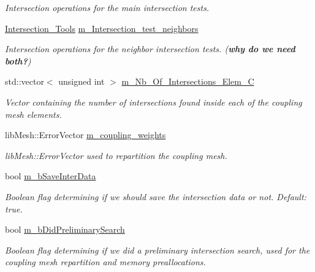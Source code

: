 \begin{DoxyCompactItemize}
\begin{DoxyCompactList}\small\item\em Intersection operations for the main intersection tests. \end{DoxyCompactList}\item 
\hyperlink{classcarl_1_1_intersection___tools}{Intersection\+\_\+\+Tools} \hyperlink{classcarl_1_1_intersection___search_a7abbfa5dc5892d9179b93563320d533b}{m\+\_\+\+Intersection\+\_\+test\+\_\+neighbors}
\begin{DoxyCompactList}\small\item\em Intersection operations for the neighbor intersection tests. ({\bfseries why do we need both?}) \end{DoxyCompactList}\item 
std\+::vector$<$ unsigned int $>$ \hyperlink{classcarl_1_1_intersection___search_af54d17052502ee0d11ec33b915e2074e}{m\+\_\+\+Nb\+\_\+\+Of\+\_\+\+Intersections\+\_\+\+Elem\+\_\+\+C}
\begin{DoxyCompactList}\small\item\em Vector containing the number of intersections found inside each of the coupling mesh elements. \end{DoxyCompactList}\item 
lib\+Mesh\+::\+Error\+Vector \hyperlink{classcarl_1_1_intersection___search_a1d44cfde49ae719c406da8bd5c463992}{m\+\_\+coupling\+\_\+weights}
\begin{DoxyCompactList}\small\item\em lib\+Mesh\+::\+Error\+Vector used to repartition the coupling mesh. \end{DoxyCompactList}\item 
bool \hyperlink{classcarl_1_1_intersection___search_a8f20721814d9dcfab34a0b6c85b88f3c}{m\+\_\+b\+Save\+Inter\+Data}
\begin{DoxyCompactList}\small\item\em Boolean flag determining if we should save the intersection data or not. {\itshape Default\+:} true. \end{DoxyCompactList}\item 
bool \hyperlink{classcarl_1_1_intersection___search_ab3d9729d5029e30fff786305c8aa3a01}{m\+\_\+b\+Did\+Preliminary\+Search}
\begin{DoxyCompactList}\small\item\em Boolean flag determining if we did a preliminary intersection search, used for the coupling mesh repartition and memory preallocations. \end{DoxyCompactList}\item 

\end{DoxyCompactItemize}
